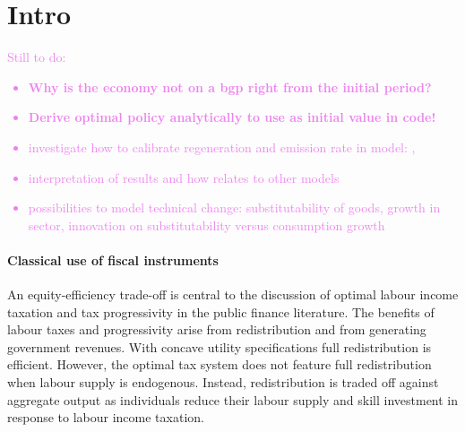 \section{Intro}





% 

\textcolor{violet}{Still to do:
\begin{itemize}
	\item \textbf{Why is the economy not on a bgp right from the initial period?}
	\item \textbf{Derive optimal policy analytically to use as initial value in code!}
	\item investigate how to calibrate regeneration and emission rate in model:  \cite{Hassler2016EnvironmentalMacroeconomics}, \cite{Rogelj2018MitigationDevelopment.} \checkmark
	\item interpretation of results and how relates to other models
	\item possibilities to model technical change: substitutability of goods, growth in sector, innovation on substitutability versus consumption growth
\end{itemize}
}
\paragraph{Classical use of fiscal instruments}
An equity-efficiency trade-off is central to the discussion of optimal labour income taxation and tax progressivity in the public finance literature.  The benefits of labour taxes and progressivity arise from redistribution and from generating government revenues. 
With concave utility specifications full redistribution is efficient. However, the optimal tax system does not feature full redistribution when labour supply is endogenous. Instead, redistribution is traded off against aggregate output as individuals reduce their labour supply and skill investment in response to labour income taxation. 

